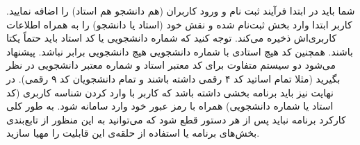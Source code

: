 شما باید در ابتدا فرآیند ثبت نام و ورود کاربران (هم دانشجو هم استاد) را اضافه نمایید. کاربر ابتدا وارد بخش ثبت‌نام شده و نقش خود (استاد یا دانشجو) را به همراه اطلاعات کاربری‌اش ذخیره می‌کند. توجه کنید که شماره دانشجویی یا کد استاد باید حتماً یکتا باشند. همچنین کد هیچ استادی با شماره دانشجویی هیچ دانشجویی برابر نباشد. پیشنهاد می‌شود دو سیستم متفاوت برای کد معتبر استاد و شماره معتبر دانشجویی در نظر بگیرید (مثلا تمام اساتید کد ۴ رقمی داشته باشند و تمام دانشجویان کد ۹ رقمی). در نهایت نیز باید برنامه بخشی داشته باشد که کاربر با وارد کردن شناسه کاربری (کد استاد یا شماره دانشجویی) همراه با رمز عبور خود وارد سامانه شود. به طور کلی کارکرد برنامه نباید پس از هر دستور قطع شود که می‌توانید به این منظور از تابع‌بندی بخش‌های برنامه یا استفاده از حلقه‌ی  این قابلیت را مهیا سازید.